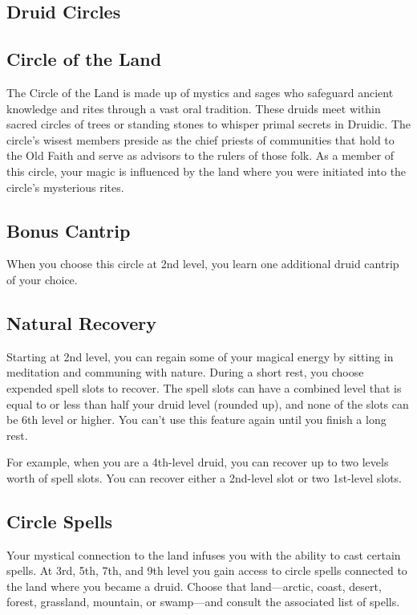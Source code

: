 \subsection{Druid Circles}

\subsection{Circle of the Land}

The Circle of the Land is made up of mystics and sages who safeguard ancient knowledge and rites through a vast oral tradition. These druids meet within sacred circles of trees or standing stones to whisper primal secrets in Druidic. The circle’s wisest members preside as the chief priests of communities that hold to the Old Faith and serve as advisors to the rulers of those folk. As a member of this circle, your magic is influenced by the land where you were initiated into the circle’s mysterious rites.

\subsection{Bonus Cantrip}

When you choose this circle at 2nd level, you learn one additional druid cantrip of your choice.

\subsection{Natural Recovery}

Starting at 2nd level, you can regain some of your magical energy by sitting in meditation and communing with nature. During a short rest, you choose expended spell slots to recover. The spell slots can have a combined level that is equal to or less than half your druid level
(rounded up), and none of the slots can be 6th level or higher. You can’t use this feature again until you finish a long rest.

For example, when you are a 4th-level druid, you can recover up to two levels worth of spell slots. You can recover either a 2nd-level slot or two 1st-level slots.

\subsection{Circle Spells}

Your mystical connection to the land infuses you with the ability to cast certain spells. At 3rd, 5th, 7th, and 9th level you gain access to circle spells connected to the land where you became a druid. Choose that land—arctic, coast, desert, forest, grassland, mountain, or swamp—and consult the associated list of spells.

